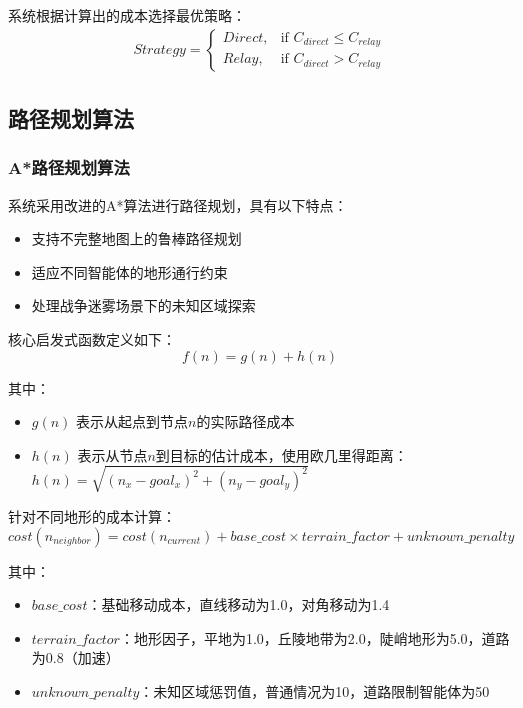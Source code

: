 \documentclass[12pt,a4paper]{article}
\begin{document}
系统根据计算出的成本选择最优策略：
\begin{align}
Strategy = 
\begin{cases}
Direct, & \text{if } C_{direct} \leq C_{relay} \\
Relay, & \text{if } C_{direct} > C_{relay}
\end{cases}
\end{align}

\subsection{路径规划算法}

\subsubsection{A*路径规划算法}

系统采用改进的A*算法进行路径规划，具有以下特点：

\begin{itemize}
    \item 支持不完整地图上的鲁棒路径规划
    \item 适应不同智能体的地形通行约束 
    \item 处理战争迷雾场景下的未知区域探索
\end{itemize}

核心启发式函数定义如下：
\begin{equation}
f(n) = g(n) + h(n)
\end{equation}

其中：
\begin{itemize}
    \item $g(n)$ 表示从起点到节点$n$的实际路径成本
    \item $h(n)$ 表示从节点$n$到目标的估计成本，使用欧几里得距离：$h(n) = \sqrt{(n_x - goal_x)^2 + (n_y - goal_y)^2}$
\end{itemize}

针对不同地形的成本计算：
\begin{equation}
cost(n_{neighbor}) = cost(n_{current}) + base\_cost \times terrain\_factor + unknown\_penalty
\end{equation}

其中：
\begin{itemize}
    \item $base\_cost$：基础移动成本，直线移动为1.0，对角移动为1.4
    \item $terrain\_factor$：地形因子，平地为1.0，丘陵地带为2.0，陡峭地形为5.0，道路为0.8（加速）
    \item $unknown\_penalty$：未知区域惩罚值，普通情况为10，道路限制智能体为50
\end{itemize}
\end{document}
